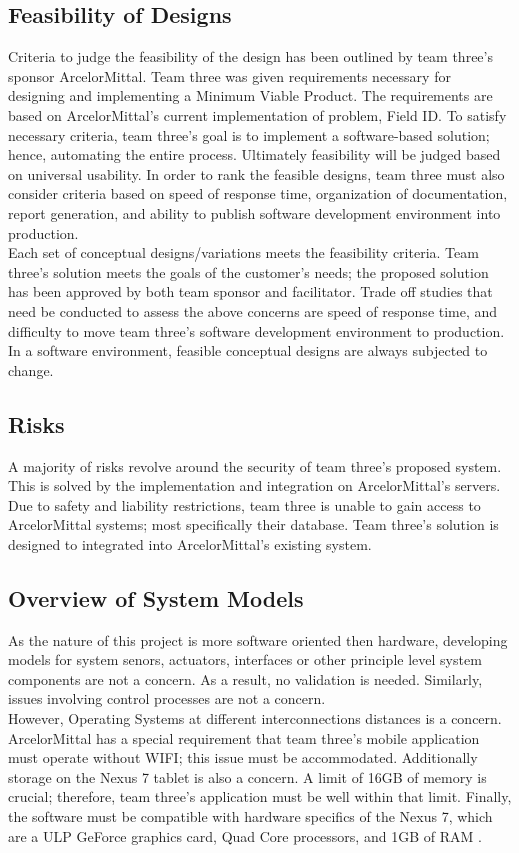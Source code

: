 \documentclass[Letter,11pt]{article}
\begin{document}
	\subsection{Feasibility of Designs}
	Criteria to judge the feasibility of the design has been outlined by team three's sponsor ArcelorMittal. Team three was given requirements necessary for designing and implementing a Minimum Viable Product. The requirements are based on ArcelorMittal's current implementation of problem, Field ID. To satisfy necessary criteria, team three's goal is to implement a software-based solution; hence, automating the entire process. Ultimately feasibility will be judged based on universal usability. In order to rank the feasible designs, team three must also consider criteria based on speed of response time, organization of documentation, report generation, and ability to publish software development environment into production. \\
	Each set of conceptual designs/variations meets the feasibility criteria. Team three's solution meets the goals of the customer's needs; the proposed solution has been approved by both team sponsor and facilitator. Trade off studies that need be conducted to assess the above concerns are speed of response time, and difficulty to move team three's software development environment to production. In a software environment, feasible conceptual designs are always subjected to change. \\
	\subsection{Risks}
	A majority of risks revolve around the security of team three's proposed system. This is solved by the implementation and integration on ArcelorMittal's servers. Due to safety and liability restrictions, team three is unable to gain access to ArcelorMittal systems; most specifically their database. Team three's solution is designed to integrated into ArcelorMittal's existing system. \\
	\subsection{Overview of System Models}
	As the nature of this project is more software oriented then hardware, developing models for system senors, actuators, interfaces or other principle level system components are not a concern. As a result, no validation is needed. Similarly, issues involving control processes are not a concern. \\
	However, Operating Systems at different interconnections distances is a concern. ArcelorMittal has a special requirement that team three's mobile application must operate without WIFI; this issue must be accommodated. Additionally storage on the Nexus 7 tablet is also a concern. A limit of 16GB of memory is crucial; therefore, team three's application must be well within that limit.  Finally, the software must be compatible with hardware specifics of the Nexus 7, which are a ULP GeForce graphics card, Quad Core processors, and 1GB of RAM \cite{nexus7}. \\
	
\end{document}
